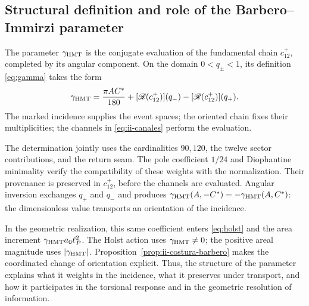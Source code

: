 \subsection{Structural definition and role of the Barbero--Immirzi parameter}
\label{sec:ii-definicion-barbero}

\begin{definition}
The parameter \(\gamma_{\mathrm{HMT}}\) is the conjugate evaluation of the
fundamental chain \(c_{12}^{+}\), completed by its angular
component. On the domain \(0<q_\pm<1\), its definition
\eqref{eq:gamma} takes the form
\begin{equation}
 \gamma_{\mathrm{HMT}}
 =\frac{\pi AC^*}{180}
  +[\mathscr R(c_{12}^{+})](q_-)
  -[\mathscr R(c_{12}^{+})](q_+).
 \label{eq:ii-definicion-barbero-evaluacion}
\end{equation}
The marked incidence supplies the event spaces; the oriented
chain fixes their multiplicities; the channels in
\eqref{eq:ii-canales} perform the evaluation.
\end{definition}

The determination jointly uses the cardinalities \(90,120\),
the twelve sector contributions, and the return seam. The
pole coefficient \(1/24\) and Diophantine minimality verify
the compatibility of these weights with the normalization. Their provenance
is preserved in \(c_{12}^{+}\), before the channels are evaluated. Angular
inversion exchanges \(q_+\) and \(q_-\) and produces
\(\gamma_{\mathrm{HMT}}(A,-C^*)=-\gamma_{\mathrm{HMT}}(A,C^*)\): the dimensionless
value transports an orientation of the incidence.

In the geometric realization, this same coefficient enters
\eqref{eq:holst} and the area increment
\(\gamma_{\mathrm{HMT}}a_0\ell_P^2\). The Holst action uses
\(\gamma_{\mathrm{HMT}}\ne0\); the positive areal magnitude uses
\(|\gamma_{\mathrm{HMT}}|\). Proposition~\ref{prop:ii-costura-barbero}
makes the coordinated change of orientation explicit. Thus, the structure
of the parameter explains what it weights in the incidence, what it preserves
under transport, and how it participates in the torsional response and in
the geometric resolution of information.
